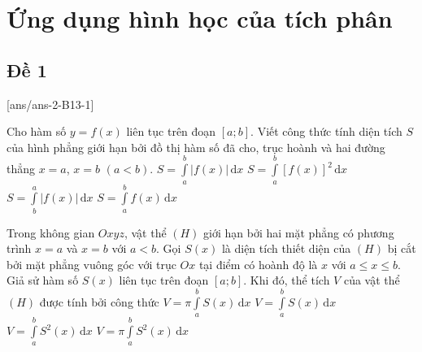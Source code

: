 \section{Ứng dụng hình học của tích phân}
\subsection{Đề 1}
[ans/ans-2-B13-1]
\caulc
\begin{ex}%
	Cho hàm số $y=f(x)$ liên tục trên đoạn $[a;b]$. Viết công thức tính diện tích $S$ của hình phẳng giới hạn bởi đồ thị hàm số đã cho, trục hoành và hai đường thẳng $x=a$, $x=b$ $(a<b)$.
	\choice
	{\True $S=\displaystyle\int\limits_a^b |f(x)|\mathrm{\,d}x$}
	{$S=\displaystyle\int\limits_a^b [f(x)]^2\mathrm{\,d}x$}
	{$S=\displaystyle\int\limits_b^a |f(x)|\mathrm{\,d}x$}
	{$S=\displaystyle\int\limits_a^b f(x)\mathrm{\,d}x$}
\end{ex}
\begin{ex}%
	Trong không gian $Oxyz$, vật thể $(H)$ giới hạn bởi hai mặt phẳng có phương trình $x=a$ và $x=b$ với $a<b$. Gọi $S(x)$ là diện tích thiết diện của $(H)$ bị cắt bởi mặt phẳng vuông góc với trục $Ox$ tại điểm có hoành độ là $x$ với $a\le x\le b$. Giả sử hàm số $S(x)$ liên tục trên đoạn $[a;b]$. Khi đó, thể tích $V$ của vật thể $(H)$ được tính bởi công thức
	\choice
	{$V=\pi\displaystyle\int\limits_a^bS(x)\mathrm{\,d}x$}
	{\True $V=\displaystyle\int\limits_a^bS(x)\mathrm{\,d}x$}
	{$V=\displaystyle\int\limits_a^bS^2(x)\mathrm{\,d}x$}
	{$V=\pi\displaystyle\int\limits_a^bS^2(x)\mathrm{\,d}x$}
\end{ex}
